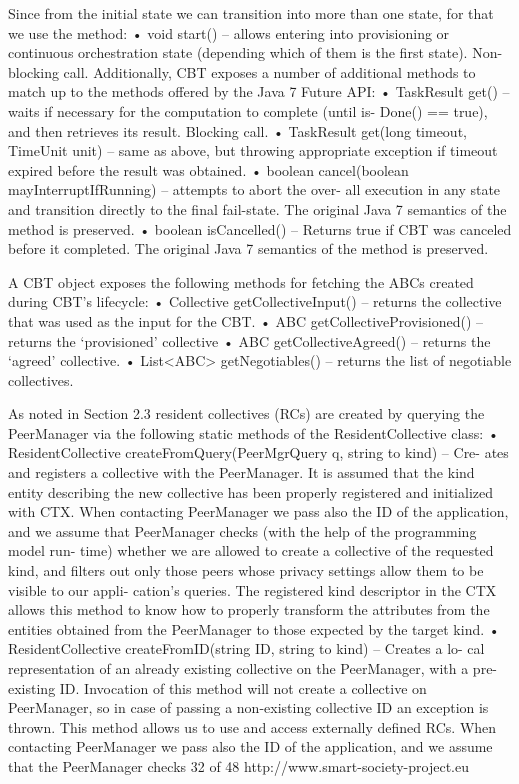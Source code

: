 Since from the initial state we can transition into more than one state, for that we use
the method:
• void start() – allows entering into provisioning or continuous orchestration state (depending which of them is the first state). Non-blocking call.
Additionally, CBT exposes a number of additional methods to match up to the methods offered by the Java 7 Future API:
• TaskResult get() – waits if necessary for the computation to complete (until is- Done() == true), and then retrieves its result. Blocking call.
• TaskResult get(long timeout, TimeUnit unit) – same as above, but throwing appropriate exception if timeout expired before the result was obtained.
• boolean cancel(boolean mayInterruptIfRunning) – attempts to abort the over- all execution in any state and transition directly to the final fail-state. The original Java 7 semantics of the method is preserved.
• boolean isCancelled() – Returns true if CBT was canceled before it completed. The original Java 7 semantics of the method is preserved.

A CBT object exposes the following methods for fetching the ABCs created during CBT’s lifecycle:
• Collective getCollectiveInput() – returns the collective that was used as the input for the CBT.
• ABC getCollectiveProvisioned() – returns the ‘provisioned’ collective
• ABC getCollectiveAgreed() – returns the ‘agreed’ collective.
• List<ABC> getNegotiables() – returns the list of negotiable collectives.

As noted in Section 2.3 resident collectives (RCs) are created by querying the PeerManager via the following static methods of the ResidentCollective class:
• ResidentCollective createFromQuery(PeerMgrQuery q, string to kind) – Cre- ates and registers a collective with the PeerManager. It is assumed that the kind entity describing the new collective has been properly registered and initialized with CTX. When contacting PeerManager we pass also the ID of the application, and we assume that PeerManager checks (with the help of the programming model run- time) whether we are allowed to create a collective of the requested kind, and filters out only those peers whose privacy settings allow them to be visible to our appli- cation’s queries. The registered kind descriptor in the CTX allows this method to know how to properly transform the attributes from the entities obtained from the PeerManager to those expected by the target kind.
• ResidentCollective createFromID(string ID, string to kind) – Creates a lo- cal representation of an already existing collective on the PeerManager, with a pre- existing ID. Invocation of this method will not create a collective on PeerManager, so in case of passing a non-existing collective ID an exception is thrown. This method allows us to use and access externally defined RCs. When contacting PeerManager we pass also the ID of the application, and we assume that the PeerManager checks
32 of 48 http://www.smart-society-project.eu
   
